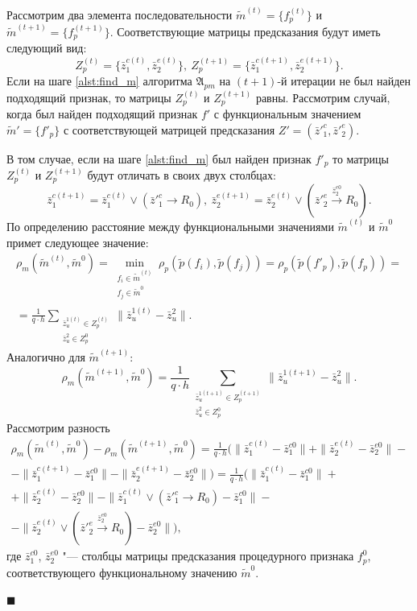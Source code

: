 \documentclass[a4paper, 12pt]{article}
\theoremstyle{plain}
\newenvironment{Proof}%
	{\par\noindent{\bf Доказательство.}}%
	{\hfill$\scriptstyle\blacksquare$}
\begin{document}
	\begin{Proof}
		Рассмотрим два элемента последовательности $\tilde m^{(t)}=\{f_p^{(t)}\}$ и $\tilde m^{(t+1)}=\{f_p^{(t+1)}\}$. Соответствующие матрицы предсказания будут иметь следующий вид:
		\begin{equation}
		Z_p^{(t)}=\{\bar z_1^{c(t)},\bar z_2^{e(t)}\},\ Z_p^{(t+1)}=\{\bar z_1^{c(t+1)},\bar z_2^{e(t+1)}\}.
		\end{equation}
		Если на шаге \ref{alst:find_m} алгоритма $\mathfrak A_{pm}$ на $(t+1)$-й итерации не был найден подходящий признак, то матрицы $Z_p^{(t)}$ и $Z_p^{(t+1)}$ равны. Рассмотрим случай, когда был найден подходящий признак $f'$ с функциональным значением $\tilde m'=\{f'_p\}$ с соответствующей матрицей предсказания $Z'=(\bar z'^c_1,\bar z'^e_2)$.
		
		В том случае, если на шаге \ref{alst:find_m} был найден признак $f'_p$ то матрицы $Z_p^{(t)}$ и $Z_p^{(t+1)}$ будут отличать в своих двух столбцах:
		\begin{equation}
		\bar z_1^{c(t+1)}=\bar z_1^{c(t)}\vee (\bar z'^c_1\rightarrow R_0),\ \bar z_2^{e(t+1)}=\bar z_2^{e(t)}\vee (\bar z'^e_2\xrightarrow{\bar z_2^{e0}} R_0).
		\end{equation}
		По определению расстояние между функциональными значениями $\tilde m^{(t)}$ и $\tilde m^0$ примет следующее значение:
		\begin{eqnarray}
		\rho_m(\tilde m^{(t)},\tilde m^0)=\min\limits_{\substack{f_i\in\tilde m^{(t)}\\f_j\in\tilde m^0}}\rho_p(\tilde p(f_i),\tilde p(f_j ))=\rho_p(\tilde p(f'_p),\tilde p(f_p))=\nonumber \\
		=\frac{1}{q\cdot h}\sum\limits_{\substack{\bar z_u^{1(t)}\in Z_p^{(t)}\\\bar z_u^2\in Z_p^0}}\|\bar z_u^{1(t)}-\bar z_u^2\|.
		\end{eqnarray}
		Аналогично для $\tilde m^{(t+1)}$:
		\begin{equation}
		\rho_m(\tilde m^{(t+1)},\tilde m^0)=\frac{1}{q\cdot h}\sum_{\substack{\bar z_u^{1(t+1)}\in Z_p^{(t+1)}\\\bar z_u^2\in Z_p^0}}\|\bar z_u^{1(t+1)}-\bar z_u^2\|.
		\end{equation}
		Рассмотрим разность 
		\begin{eqnarray}
		\rho_m(\tilde m^{(t)},\tilde m^0)-\rho_m(\tilde m^{(t+1)},\tilde m^0)=\frac{1}{q\cdot h}(\|\bar z_1^{c(t)}-\bar z_1^{c0}\|+\|\bar z_2^{e(t)}-\bar z_2^{e0}\|-\nonumber \\
		-\|\bar z_1^{c(t+1)}-\bar z_1^{c0}\|-\|\bar z_2^{e(t+1)}-\bar z_2^{e0}\|)=\frac{1}{q\cdot h}(\|\bar z_1^{c(t)}-\bar z_1^{c0}\|+\nonumber \\
		+\|\bar z_2^{e(t)}-\bar z_2^{e0}\|-\|\bar z_1^{c(t)}\vee (\bar z'^c_1\rightarrow R_0)-\bar z_1^{c0}\|-\nonumber \\
		-\|\bar z_2^{e(t)}\vee (\bar z'^e_2\xrightarrow{\bar z_2^{e0}} R_0)-\bar z_2^{e0}\|),
		\end{eqnarray}
		где $\bar z_1^{c0}$, $\bar z_2^{e0}$ "--- столбцы матрицы предсказания процедурного признака $f_p^0$, соответствующего функциональному значению $\tilde m^0$.
		

\end{Proof}
\end{document}
